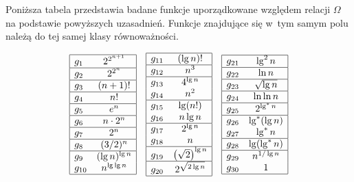 Poniższa tabela przedstawia badane funkcje uporządkowane względem relacji $\Omega$ na podstawie powyższych uzasadnień. Funkcje znajdujące się w~tym samym polu należą do tej samej klasy równoważności.
\begin{table}[h]
	\begin{center}
		\[
			\begin{array}{|lc|} \hline
				g_1 & 2^{2^{n+1}} \\ \hline
				g_2 & 2^{2^n} \\ \hline
				g_3 & (n+1)! \\ \hline
				g_4 & n! \\ \hline
				g_5 & e^n \\ \hline
				g_6 & n\cdot 2^n \\ \hline
				g_7 & 2^n \\ \hline
				g_8 & (3/2)^n \\ \hline
				g_9 & (\lg n)^{\lg n} \\
				g_{10} & n^{\lg\lg n} \\ \hline
			\end{array}
			\quad
			\begin{array}{|lc|} \hline
				g_{11} & (\lg n)! \\ \hline
				g_{12} & n^3 \\ \hline
				g_{13} & 4^{\lg n} \\
				g_{14} & n^2 \\ \hline
				g_{15} & \lg (n!) \\
				g_{16} & n\lg n \\ \hline
				g_{17} & 2^{\lg n} \\
				g_{18} & n \\ \hline
				g_{19} & \left(\sqrt{2}\right)^{\lg n} \\ \hline
				g_{20} & 2^{\sqrt{2\lg n}} \\ \hline
			\end{array}
			\quad
			\begin{array}{|lc|} \hline
				g_{21} & \lg^2n \\ \hline
				g_{22} & \ln n \\ \hline
				g_{23} & \sqrt{\lg n} \\ \hline
				g_{24} & \ln\ln n \\ \hline
				g_{25} & 2^{\lg^*n} \\ \hline
				g_{26} & \lg^*(\lg n) \\
				g_{27} & \lg^*n \\ \hline
				g_{28} & \lg(\lg^*n) \\ \hline
				g_{29} & n^{1/\lg n} \\
				g_{30} & 1 \\ \hline
			\end{array}
		\]
	\end{center}
	\caption{Uporządkowanie funkcji względem relacji $\Omega$}
\end{table}

